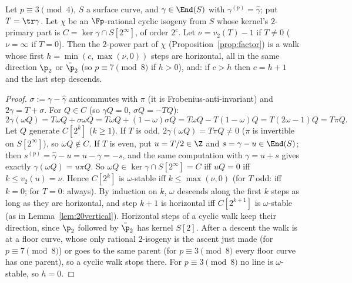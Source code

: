\begin{proposition}\label{prop:walk}
Let $p\equiv3\pmod4$, $S$ a surface curve, and $\gamma\in\End(S)$ with $\gamma^{(p)}=\widehat\gamma$; put $T=\tr\gamma$.  Let
$\chi$ be an $\Fp$-rational cyclic isogeny from $S$ whose kernel's $2$-primary part is $C=\ker\gamma\cap S[2^\infty]$, of order
$2^c$.  Let $\nu=v_2(T)-1$ if $T\ne0$ ($\nu=\infty$ if $T=0$).  Then the $2$-power part of $\chi$ (Proposition~\ref{prop:factor}) is a walk
whose first $h=\min(c,\max(\nu,0))$ steps are horizontal, all in the same direction $\p_2$ or $\bar\p_2$ (so $p\equiv7\pmod8$ if $h>0$), and:
if $c>h$ then $c=h+1$ and the last step descends.
\end{proposition}
\begin{proof}
$\sigma:=\gamma-\widehat\gamma$ anticommutes with $\pi$ (it is Frobenius-anti-invariant) and $2\gamma=T+\sigma$.  For $Q\in C$
(so $\gamma Q=0$, $\sigma Q=-TQ$):
\[2\gamma(\omega Q)=T\omega Q+\sigma\omega Q=T\omega Q+(1-\omega)\sigma Q=T\omega Q-T(1-\omega)Q=T(2\omega-1)Q=T\pi Q.\]
Let $Q$ generate $C[2^k]$ ($k\ge1$).  If $T$ is odd, $2\gamma(\omega Q)=T\pi Q\neq0$ ($\pi$ is invertible on $S[2^\infty]$), so
$\omega Q\notin C$.  If $T$ is even, put $u=T/2\in\Z$ and $s=\gamma-u\in\End(S)$; then $s^{(p)}=\widehat\gamma-u=u-\gamma=-s$, and the same
computation with $\gamma=u+s$ gives exactly $\gamma(\omega Q)=u\pi Q$.  So $\omega Q\in\ker\gamma\cap S[2^\infty]=C$ iff $uQ=0$ iff $k\le v_2(u)=\nu$.
Hence $C[2^k]$ is $\omega$-stable iff $k\le\max(\nu,0)$ (for $T$ odd: iff $k=0$; for $T=0$: always).  By induction on $k$, $\omega$ descends along the first $k$ steps as long as they are
horizontal, and step $k+1$ is horizontal iff $C[2^{k+1}]$ is $\omega$-stable (as in Lemma~\ref{lem:20vertical}).  Horizontal steps of a
cyclic walk keep their direction, since $\p_2$ followed by $\bar\p_2$ has kernel $S[2]$.  After a descent the walk is at a floor curve,
whose only rational $2$-isogeny is the ascent just made (for $p\equiv7\pmod8$) or goes to the same parent (for $p\equiv3\pmod8$
every floor curve has one parent), so a cyclic walk stops there.  For $p\equiv3\pmod8$ no line is $\omega$-stable, so $h=0$.
\end{proof}

